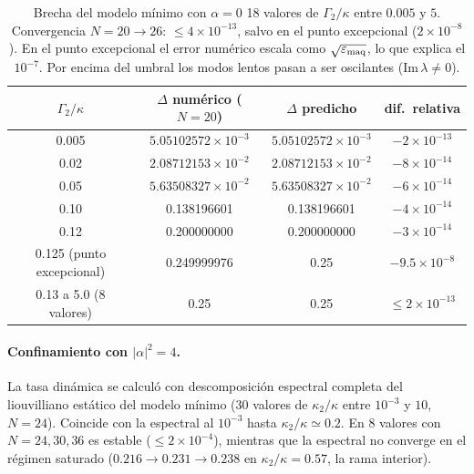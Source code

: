 \documentclass[11pt,a4paper]{article}
\theoremstyle{definition}
\begin{document}
\begin{table}[h]
\centering
\begin{tabular}{cccc}
\toprule
$\Gamma_2/\kappa$ & $\Delta$ numérico ($N=20$) & $\Delta$ predicho & dif.\ relativa\\
\midrule
0.005 & $5.05102572\times10^{-3}$ & $5.05102572\times10^{-3}$ & $-2\times10^{-13}$\\
0.02 & $2.08712153\times10^{-2}$ & $2.08712153\times10^{-2}$ & $-8\times10^{-14}$\\
0.05 & $5.63508327\times10^{-2}$ & $5.63508327\times10^{-2}$ & $-6\times10^{-14}$\\
0.10 & 0.138196601 & 0.138196601 & $-4\times10^{-14}$\\
0.12 & 0.200000000 & 0.200000000 & $-3\times10^{-14}$\\
0.125 (punto excepcional) & 0.249999976 & 0.25 & $-9.5\times10^{-8}$\\
0.13 a 5.0 (8 valores) & 0.25 & 0.25 & $\leq2\times10^{-13}$\\
\bottomrule
\end{tabular}
\caption{Brecha del modelo mínimo con $\alpha=0$ 18 valores de $\Gamma_2/\kappa$ entre $0.005$ y $5$. Convergencia $N=20\to26$: $\leq4\times10^{-13}$, salvo en el punto excepcional ($2\times10^{-8}$). En el punto excepcional el error numérico escala como $\sqrt{\varepsilon_{\rm maq}}$, lo que explica el $10^{-7}$. Por encima del umbral los modos lentos pasan a ser oscilantes ($\mathrm{Im}\,\lambda\neq0$).}
\label{tab:V6}
\end{table}

\paragraph{Confinamiento con $|\alpha|^2=4$.} La tasa dinámica se calculó con descomposición espectral completa del liouvilliano estático del modelo mínimo (30 valores de $\kappa_2/\kappa$ entre $10^{-3}$ y $10$, $N=24$). Coincide con la espectral al $10^{-3}$ hasta $\kappa_2/\kappa\simeq0.2$. En 8 valores con $N=24,30,36$ es estable ($\leq2\times10^{-4}$), mientras que la espectral no converge en el régimen saturado ($0.216\to0.231\to0.238$ en $\kappa_2/\kappa=0.57$, la rama interior).
\end{document}
